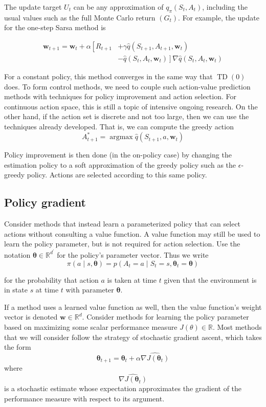 \documentclass[11pt]{article}
\theoremstyle{plain} %
\theoremstyle{remark}
\begin{document}
 The update target $U_{t}$ can be any approximation of
  $q_{\pi}\left(S_{t}, A_{t}\right)$, including the usual values such as the
  full Monte Carlo return $\left(G_{t}\right)$. For example, the update for the one-step Sarsa method is
 
$$
\begin{aligned}
\boldsymbol{w}_{t+1}=\boldsymbol{w}_{t}+\alpha\left[R_{t+1}\right. & +\gamma \hat{q}\left(S_{t+1}, A_{t+1}, \boldsymbol{w}_{t}\right) \\
& \left.-\hat{q}\left(S_{t}, A_{t}, \boldsymbol{w}_{t}\right)\right] \nabla \hat{q}\left(S_{t}, A_{t}, \boldsymbol{w}_{t}\right)
\end{aligned}
$$

 For a constant policy, this method converges in the same way that
  $\operatorname{TD}(0)$ does.  To form control methods, we need to couple such action-value prediction
  methods with techniques for policy improvement and action selection. For continuous action space, this is still a topic of intensive ongoing
  research. On the other hand, if the action set is discrete and not too large, then
  we can use the techniques already developed. That is, we can compute the greedy action
$$
A_{t+1}^{*}=\operatorname{argmax} \hat{q}\left(S_{t+1}, a, \boldsymbol{w}_{t}\right)
$$

 Policy improvement is then done (in the on-policy case) by changing the
  estimation policy to a soft approximation of the greedy policy such as the
  $\epsilon$-greedy policy. Actions are selected according to this same policy.

\subsection{Policy gradient}
 Consider methods that instead learn a parameterized policy that can
  select actions without consulting a value function. A value function may still be used to learn the policy parameter, but is
  not required for action selection. Use the notation $\boldsymbol{\theta} \in \mathbb{R}^{d^{\prime}}$ for
  the policy's parameter vector. Thus we write
$$
\pi(a \mid s, \boldsymbol{\theta})=p\left(A_{t}=a \mid S_{t}=s, \boldsymbol{\theta}_{t}=\boldsymbol{\theta}\right)
$$

for the probability that action $a$ is taken at time $t$ given that the
environment is in state $s$ at time $t$ with parameter $\boldsymbol{\theta}$.

 If a method uses a learned value function as well, then the value
  function's weight vector is denoted $\boldsymbol{w} \in \mathbb{R}^{d}$. Consider methods for learning the policy parameter based on maximizing
  some scalar performance measure $J(\theta) \in \mathbb{R}$. Most methods that we will consider follow the strategy of stochastic
  gradient ascent, which takes the form
$$
\boldsymbol{\theta}_{t+1}=\boldsymbol{\theta}_{t}+\alpha \widehat{\nabla J\left(\boldsymbol{\theta}_{t}\right)}
$$
where
$$
\widehat{\nabla J\left(\boldsymbol{\theta}_{t}\right)}
$$
is a stochastic estimate whose expectation approximates the gradient of the
performance measure with respect to its argument.
\end{document}
